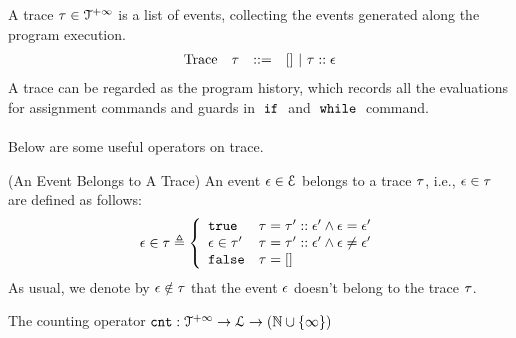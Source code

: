 %
A trace $\mathtt{\tau} \in \mathcal{T}^{+\infty}$ is a list of events, 
collecting the events generated along the program execution. 
\[
\begin{array}{llll}
\mbox{Trace} & \mathtt{\tau}
& ::= & [] ~|~ \mathtt{\tau} :: \mathtt{\epsilon} 
\end{array}
\]
A trace can be regarded as the program history, 
which records all the evaluations for assignment commands and guards in $\;\mathtt{if}\;$ and $\;\mathtt{while}\;$ command.
\\
\\
Below are some useful operators on trace.
\begin{defn}(An Event Belongs to A Trace)
  An event $\mathtt{\epsilon} \in \mathcal{E}$ belongs to a trace $\mathtt{\tau}$, i.e., $\mathtt{\epsilon} \in \mathtt{\tau}$ are defined as follows:
%
\begin{equation*}
  \event \in \trace  
  \triangleq \left\{
  \begin{array}{ll} 
    \etrue                  & \trace =  \trace' :: \event'
     \land \event = \event' \\
    \event \in \trace' & \trace =  \trace' :: \event'
    \land \event \neq \event' \\ 
    \efalse                 & \trace = []
  \end{array}
  \right.
\end{equation*}
As usual, we denote by $\mathtt{\epsilon} \notin \mathtt{\tau}$ that the event $\mathtt{\epsilon}$ doesn't belong to the trace $\mathtt{\tau}$.
\end{defn}
%
The counting operator $\mathtt{cnt} : \mathcal{T}^{+\infty} \to \mathcal{L} \to (\mathbb{N} \cup \{\infty\})$
